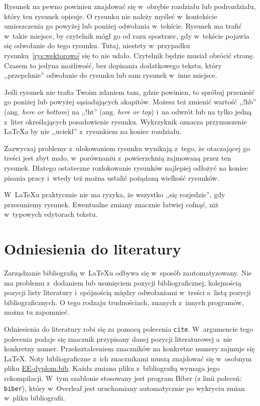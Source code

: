 Rysunek na pewno powinien znajdować się w~obrębie rozdziału lub podrozdziału, który ten rysunek opisuje. O rysunku nie należy myśleć w~kontekście umieszczenia go powyżej lub poniżej odwołania w~tekście. Rysunek ma trafić w~takie miejsce, by czytelnik mógł go od razu spostrzec, gdy w~tekście pojawia się odwołanie do tego rysunku. Tutaj, niestety w~przypadku rysunku~\ref{rys:wektorowo} się to nie udało. Czytelnik będzie musiał obrócić stronę. Czasem to jedyna możliwość, bez dopisania dodatkowego tekstu, który ,,przepchnie'' odwołanie do rysunku lub sam rysunek w~inne miejsce.

Jeśli rysunek nie trafia Twoim zdaniem tam, gdzie powinien, to spróbuj przenieść go poniżej lub powyżej sąsiadujących akapitów. Możesz też zmienić wartość ,,!hb'' (ang. \textit{here or bottom}) na ,,!ht'' (ang. \textit{here or top}) i~na odwrót lub na tylko jedną z~liter określających posadowienie rysunku. Wykrzyknik oznacza przymuszenie \LaTeX{a} by nie ,,uciekł'' z~rysunkiem na koniec rozdziału.

Zazwyczaj problemy z~ulokowaniem rysunku wynikają z~tego, że otaczającej go treści jest zbyt mało, w~porównaniu z~powierzchnią zajmowaną przez ten rysunek. Dlatego ostateczne rozlokowanie rysunków najlepiej odłożyć na koniec pisania pracy i~wtedy też można ustalić pożądaną wielkość rysunków.

W~\LaTeX{u} praktycznie nie ma ryzyka, że wszystko ,,się rozjedzie'', gdy przesuniemy rysunek. Ewentualne zmiany znacznie łatwiej cofnąć, niż w~typowych edytorach tekstu.

\section{Odniesienia do literatury}
Zarządzanie bibliografią w~\LaTeX{u} odbywa się w~sposób zautomatyzowany. Nie ma problemu z~dodaniem lub usunięciem pozycji bibliograficznej, kolejnością pozycji listy literatury i~spójnością między odwołaniami w~treści a~listą pozycji bibliograficznych. O tego rodzaju trudnościach, znanych z~innych programów, można tu zapomnieć.

Odniesienia do literatury robi się za pomocą polecenia \texttt{cite}. W~argumencie tego polecenia podaje się znacznik przypisany danej pozycji literaturowej a~nie konkretny numer. Przekształceniem znaczników na konkretne numery zajmuje się \LaTeX{}. Noty bibliograficzne z~ich znacznikami muszą znajdować się w~osobnym pliku \href{./EE-dyplom.bib}{EE-dyplom.bib}. Każda zmiana pliku z~bibliografią wymaga jego rekompilacji. W~tym szablonie stosowany jest program Biber (z linii poleceń: \texttt{biber}), który w~Overleaf jest uruchamiany automatycznie po wykryciu zmian w~pliku bibliografii.


